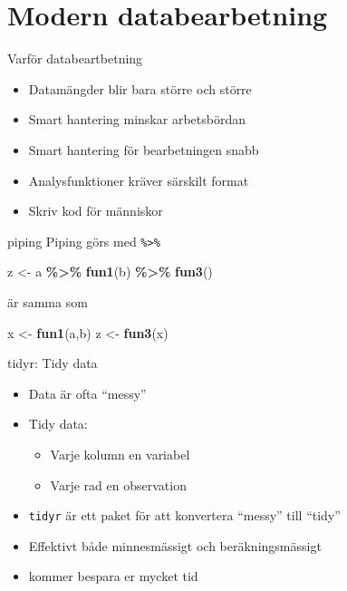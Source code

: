 \documentclass[
  10pt,
  ignorenonframetext,
  handout]{beamer}
\newenvironment{Shaded}{\begin{snugshade}}{\end{snugshade}}
\newcommand{\FunctionTok}[1]{\textcolor[rgb]{0.13,0.29,0.53}{\textbf{#1}}}
\newcommand{\NormalTok}[1]{#1}
\newcommand{\OtherTok}[1]{\textcolor[rgb]{0.56,0.35,0.01}{#1}}
\newcommand{\SpecialCharTok}[1]{\textcolor[rgb]{0.81,0.36,0.00}{\textbf{#1}}}
\providecommand{\tightlist}{%
  \setlength{\itemsep}{0pt}\setlength{\parskip}{0pt}}
\begin{document}
\section{Modern databearbetning}\label{modern-databearbetning}

\begin{frame}{Varför databeartbetning}
\label{varfuxf6r-databeartbetning}
\begin{itemize}
\tightlist
\item
  Datamängder blir bara större och större
\item
  Smart hantering minskar arbetsbördan
\item
  Smart hantering för bearbetningen snabb
\item
  Analysfunktioner kräver särskilt format
\item
  Skriv kod för människor
\end{itemize}
\end{frame}

\begin{frame}[fragile]{piping}
\label{piping}
Piping görs med \texttt{\%\textgreater{}\%}

\begin{Shaded}
\begin{Highlighting}[]
\NormalTok{z }\OtherTok{\textless{}{-}}\NormalTok{ a }\SpecialCharTok{\%\textgreater{}\%}
  \FunctionTok{fun1}\NormalTok{(b) }\SpecialCharTok{\%\textgreater{}\%}
  \FunctionTok{fun3}\NormalTok{()}
\end{Highlighting}
\end{Shaded}

är samma som

\begin{Shaded}
\begin{Highlighting}[]
\NormalTok{x }\OtherTok{\textless{}{-}} \FunctionTok{fun1}\NormalTok{(a,b)}
\NormalTok{z }\OtherTok{\textless{}{-}} \FunctionTok{fun3}\NormalTok{(x)}
\end{Highlighting}
\end{Shaded}
\end{frame}

\begin{frame}[fragile]{tidyr: Tidy data}
\label{tidyr-tidy-data}
\begin{itemize}
\tightlist
\item
  Data är ofta ``messy''
\item
  Tidy data:

  \begin{itemize}
  \tightlist
  \item
    Varje kolumn en variabel
  \item
    Varje rad en observation
  \end{itemize}
\item
  \texttt{tidyr} är ett paket för att konvertera ``messy'' till ``tidy''
\item
  Effektivt både minnesmässigt och beräkningsmässigt
\item
  kommer bespara er mycket tid
\end{itemize}
\end{frame}
\end{document}
